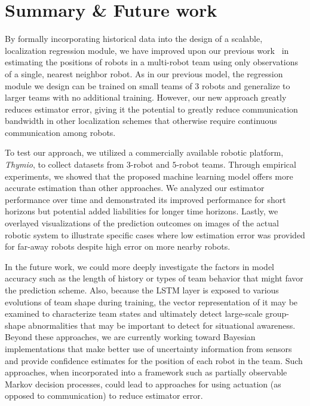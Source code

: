 \documentclass[letterpaper, 10 pt, conference]{ieeeconf}  %
\begin{document}
	\section{Summary \& Future work}
	\label{sec:discussion_and_future_work}

    By formally incorporating historical data into the design of a
    scalable, localization regression module, we have improved upon our
    previous work~\cite{CPR17} in estimating the positions of robots in
    a multi-robot team using only observations of a single, nearest
    neighbor robot. As in our previous model, the regression module we
    design can be trained on small teams of 3 robots and generalize to
    larger teams with no additional training. However, our new approach
    greatly reduces estimator error, giving it the potential to greatly
    reduce communication bandwidth in other localization schemes that
    otherwise require continuous communication among robots.

    To test our approach, we utilized a commercially available robotic
    platform, \emph{Thymio}, to collect datasets from $3$-robot and
    $5$-robot teams. Through empirical experiments, we showed that the
    proposed machine learning model offers more accurate estimation than
    other approaches. We analyzed our estimator performance over time
    and demonstrated its improved performance for short horizons but
    potential added liabilities for longer time horizons. Lastly, we
    overlayed visualizations of the prediction outcomes on images of the
    actual robotic system to illustrate specific cases where low
    estimation error was provided for far-away robots despite high error
    on more nearby robots.

    In the future work, we could more deeply investigate the factors in
    model accuracy such as the length of history or types of team
    behavior that might favor the prediction scheme. Also, because the
    LSTM layer is exposed to various evolutions of team shape during
    training, the vector representation of it may be examined to
    characterize team states and ultimately detect large-scale
    group-shape abnormalities that may be important to detect for
    situational awareness. 
    Beyond these approaches, we are currently
    working toward Bayesian implementations that make better use of
    uncertainty information from sensors and provide confidence
    estimates for the position of each robot in the team. Such
    approaches, when incorporated into a framework such as partially
    observable Markov decision processes, could lead to approaches for
    using actuation (as opposed to communication) to reduce estimator
    error.

{\small
	
	
}
\end{document}
